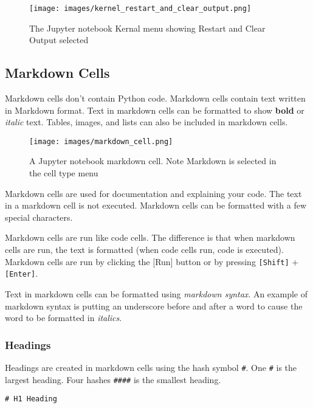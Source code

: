 \documentclass{book}
\makeatletter
\def\maxwidth{\ifdim\Gin@nat@width>\linewidth\linewidth
\else\Gin@nat@width\fi}
\let\Oldincludegraphics\includegraphics
\renewcommand{\includegraphics}[1]{\Oldincludegraphics[width=.8\maxwidth]{#1}}
\newcommand{\passthrough}[1]{#1}
\makeatother
\begin{document}
\begin{figure}
\centering
\texttt{[image: images/kernel\_restart\_and\_clear\_output.png]}
\caption{The Jupyter notebook Kernal menu showing Restart and Clear
Output selected}
\end{figure}
    




    
        \hypertarget{markdown-cells}{%
\subsection{Markdown Cells}\label{markdown-cells}}

Markdown cells don't contain Python code. Markdown cells contain text
written in Markdown format. Text in markdown cells can be formatted to
show \textbf{bold} or \emph{italic} text. Tables, images, and lists can
also be included in markdown cells.

\begin{figure}
\centering
\texttt{[image: images/markdown\_cell.png]}
\caption{A Jupyter notebook markdown cell. Note Markdown is selected in
the cell type menu}
\end{figure}

Markdown cells are used for documentation and explaining your code. The
text in a markdown cell is not executed. Markdown cells can be formatted
with a few special characters.

Markdown cells are run like code cells. The difference is that when
markdown cells are run, the text is formatted (when code cells run, code
is executed). Markdown cells are run by clicking the {[}Run{]} button or
by pressing \passthrough{\lstinline![Shift]!} +
\passthrough{\lstinline![Enter]!}.

Text in markdown cells can be formatted using \emph{markdown syntax}. An
example of markdown syntax is putting an underscore before and after a
word to cause the word to be formatted in \emph{italics}.

\hypertarget{headings}{%
\subsubsection{Headings}\label{headings}}

Headings are created in markdown cells using the hash symbol
\passthrough{\lstinline!#!}. One \passthrough{\lstinline!#!} is the
largest heading. Four hashes \passthrough{\lstinline!####!} is the
smallest heading.

\begin{lstlisting}
# H1 Heading
\end{lstlisting}
\end{document}
